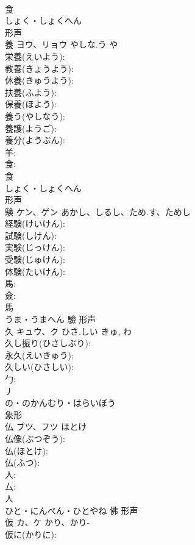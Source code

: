 \documentclass[8pt]{extreport}
\begin{document}
\begin{CJK}{UTF8}{min}
\\	食	
\\	しょく・しょくへん	
\\	形声 
\\	養	ヨウ、リョウ	やしな.う	や	
\\	栄養(えいよう): 
\\	教養(きょうよう): 
\\	休養(きゅうよう): 
\\	扶養(ふよう): 
\\	保養(ほよう): 
\\	養う(やしなう): 
\\	養護(ようご): 
\\	養分(ようぶん): 
\\	羊: 
\\	食: 
\\	食	
\\	しょく・しょくへん	
\\	形声 
\\	験	ケン、ゲン	あかし、しるし、ため.す、ためし		
\\	経験(けいけん): 
\\	試験(しけん): 
\\	実験(じっけん): 
\\	受験(じゅけん): 
\\	体験(たいけん): 
\\	馬: 
\\	僉: 
\\	馬	
\\	うま・うまへん	驗	形声 
\\	久	キュウ、ク	ひさ.しい	きゅ, わ	
\\	久し振り(ひさしぶり): 
\\	永久(えいきゅう): 
\\	久しい(ひさしい): 
\\	勹: 
\\	丿	
\\	の・のかんむり・はらいぼう	
\\	象形 
\\	仏	ブツ、フツ	ほとけ		
\\	仏像(ぶつぞう): 
\\	仏(ほとけ): 
\\	仏(ふつ): 
\\	人: 
\\	厶: 
\\	人	
\\	ひと・にんべん・ひとやね	佛	形声 
\\	仮	カ、ケ	かり、かり-		
\\	仮に(かりに): 

\end{CJK}
\end{document}
